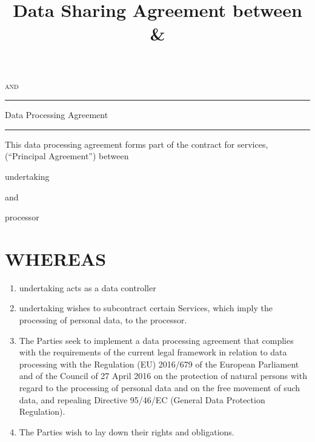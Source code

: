 \documentclass[a4paper]{article}
\title{Data Sharing Agreement between \Glsentrytext{undertaking} \& \Glsentrytext{processor}}
\begin{document}
\begin{titlepage}

\centering

\vspace{0.4\textheight}

\vspace{3cm}

\scshape{}

\vspace{0.1\textheight}

\scshape{and}

\vspace{0.1\textheight}

\scshape{}

\vspace{0.2\textheight}


\rule{0.5\textwidth}{0.4pt}

Data Processing Agreement

\rule{0.5\textwidth}{0.4pt}

\end{titlepage}

\clearpage

This data processing agreement forms part of the contract for services, (``Principal Agreement'') between

\vspace{2em}

\Gls{undertaking}

\vspace{2em}

and

\vspace{2em}

\Gls{processor}

\vspace{2em}

\section*{WHEREAS}

\begin{enumerate}

	\item{\Gls{undertaking} acts as a data controller}
	\item{\Gls{undertaking} wishes to subcontract certain Services, which imply the processing of personal data, to the \gls{processor}.}
	\item{The Parties seek to implement a data processing agreement that complies with the requirements of the current legal framework in relation to data processing with the Regulation (EU) 2016/679 of the European Parliament and of the Council of 27 April 2016 on the protection of natural persons with regard to the processing of personal data and on the free movement of such data, and repealing Directive 95/46/EC (General Data Protection Regulation).}
	\item{The Parties wish to lay down their rights and obligations.}

\end{enumerate}
\end{document}
